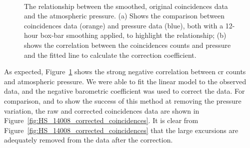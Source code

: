 \begin{figure}[ht!]
	\centering
	 \\
	
	\caption{The relationship between the smoothed, original coincidences data and the atmospheric pressure. (a) Shows the comparison between coincidences data (orange) and pressure data (blue), both with a 12-hour box-bar smoothing applied, to highlight the relationship; (b) shows the correlation between the coincidences counts and pressure and the fitted line to calculate the correction coefficient.}
	\label{fig:14008_CR_V_P_corr}
\end{figure}



As expected, Figure~\ref{fig:14008_CR_V_P_corr} shows the strong negative correlation between \gls{cr} counts and atmospheric pressure. We were able to fit the linear model to the observed data, and the negative barometric coefficient was used to correct the data. For comparison, and to show the success of this method at removing the pressure variation, the raw and corrected coincidences data are shown in Figure~\ref{fig:HS_14008_corrected_coincidences}. It is clear from Figure~\ref{fig:HS_14008_corrected_coincidences} that the large excursions are adequately removed from the data after the correction.


